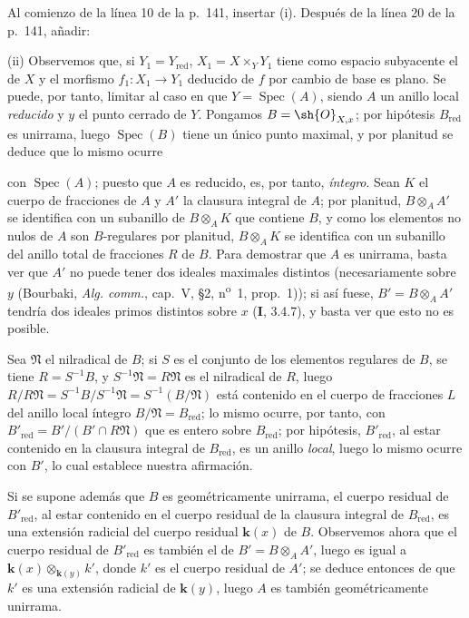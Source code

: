 Al comienzo de la línea 10 de la p.~141, insertar (i). Después de la línea 20
de la p.~141, añadir:

\smallskip
\noindent
\textup{(ii)} Observemos que, si $Y_1=Y_{\mathrm{red}}$,
$X_1=X\times_Y Y_1$ tiene como espacio subyacente el de $X$ y el
morfismo $f_1:X_1\to Y_1$ deducido de $f$ por cambio de base es
plano. Se puede, por tanto, limitar al caso en que $Y=\operatorname{Spec}(A)$,
siendo $A$ un anillo local \emph{reducido} y $y$ el punto cerrado de $Y$. Pongamos
$B=\sh{O}_{X,x}$; por hipótesis $B_{\mathrm{red}}$ es unirrama, luego
$\operatorname{Spec}(B)$ tiene un único punto maximal, y por planitud
{} se deduce que lo mismo ocurre

con $\operatorname{Spec}(A)$; puesto que $A$ es reducido, es, por tanto,
\emph{íntegro}. Sean $K$ el cuerpo de fracciones de $A$ y $A'$ la clausura
integral de $A$; por planitud, $B\otimes_AA'$ se identifica con un
subanillo de $B\otimes_AK$ que contiene $B$, y como los elementos no
nulos de $A$ son $B$-regulares por planitud, $B\otimes_AK$ se identifica
con un subanillo del anillo total de fracciones $R$ de $B$. Para
demostrar que $A$ es unirrama, basta ver que $A'$ no puede tener
dos ideales maximales distintos (necesariamente sobre $y$
(Bourbaki, \emph{Alg. comm.}, cap.~V, \S2,
n\textsuperscript{o}~1, prop.~1)); si así fuese,
$B'=B\otimes_AA'$ tendría dos ideales primos distintos sobre
$x$ (\textbf I, 3.4.7), y basta ver que esto no es posible.

Sea $\mathfrak N$ el nilradical de $B$; si $S$ es el conjunto de los
elementos regulares de $B$, se tiene $R=S^{-1}B$, y
$S^{-1}\mathfrak N=R\mathfrak N$ es el nilradical de $R$, luego
$R/R\mathfrak N=S^{-1}B/S^{-1}\mathfrak N=S^{-1}(B/\mathfrak N)$
está contenido en el cuerpo de fracciones $L$ del anillo local íntegro
$B/\mathfrak N=B_{\mathrm{red}}$; lo mismo ocurre, por tanto, con
$B'_{\mathrm{red}}=B'/(B'\cap R\mathfrak N)$
que es entero sobre $B_{\mathrm{red}}$; por hipótesis,
$B'_{\mathrm{red}}$, al estar contenido en la clausura integral de
$B_{\mathrm{red}}$, es un anillo \emph{local}, luego lo mismo ocurre con
$B'$, lo cual establece nuestra afirmación.

Si se supone además que $B$ es geométricamente unirrama, el cuerpo
residual de $B'_{\mathrm{red}}$, al estar contenido en el cuerpo residual de
la clausura integral de $B_{\mathrm{red}}$, es una extensión radicial
del cuerpo residual $\boldsymbol{k}(x)$ de $B$. Observemos ahora que el cuerpo residual
de $B'_{\mathrm{red}}$ es también el de $B'=B\otimes_AA'$, luego es
igual a $\boldsymbol{k}(x)\otimes_{\mathbf{k}(y)}k'$, donde $k'$ es el cuerpo residual de $A'$;
se deduce entonces de {} que $k'$
es una extensión radicial de $\boldsymbol{k}(y)$, luego $A$ es también
geométricamente unirrama.

